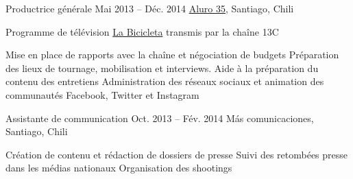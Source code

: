 \begin{joblist}
    
    
\item[Productrice générale]{Mai 2013 -- Déc. 2014}
     {\href{https://www.aluro35.com/}  {Aluro 35}, Santiago, Chili}
     {Programme de télévision \href{http://www.13.cl/c/programas/la-bicicleta}{La Bicicleta} transmis par la chaîne 13C \\
			
			\iftbftiny \setlength{\parskip}{-10pt} \fi
			\begin{itemize}
			  \iftbftiny \setlength\itemsep{-3pt} \fi
			  \cvitem[\checkmark] Mise en place de rapports avec la chaîne et négociation de budgets                       
			  \cvitem[\checkmark] Préparation des lieux de tournage, mobilisation et interviews. Aide à la préparation du contenu des entretiens 
			  \cvitem[\checkmark] Administration des réseaux sociaux et animation des communautés Facebook, Twitter et Instagram                
			\end{itemize}     
			
	}



\item[Assistante de communication]{Oct. 2013 -- Fév. 2014 }     
  	{Más comunicaciones, Santiago, Chili}     
  	{

		\iftbftiny \setlength{\parskip}{-10pt} \fi
		\begin{itemize}
			  \iftbftiny \setlength\itemsep{-3pt} \fi
			  \cvitem[\checkmark]  Création de contenu et rédaction de dossiers de presse                                        
			  \cvitem[\checkmark]  Suivi des retombées presse dans les médias nationaux                                             
			  \cvitem[\checkmark]  Organisation des shootings


\end{itemize}}
\end{joblist}
